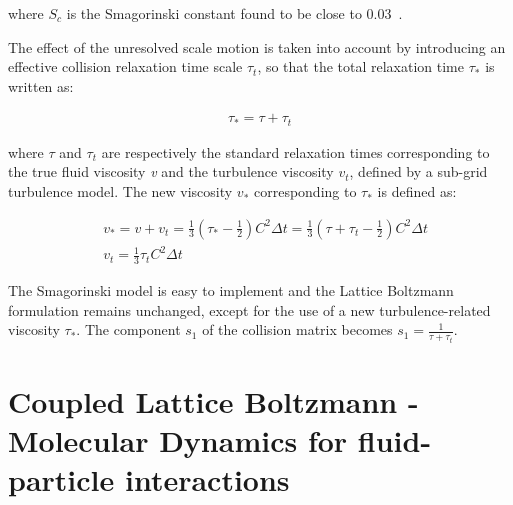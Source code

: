 where $\mathit{S}_{c}$ is the Smagorinski constant found to be close to 
0.03~\citep{yu2005}. 

The effect of the unresolved scale motion is taken into account by introducing 
an effective collision relaxation time scale $\tau_{t}$, so that the total 
relaxation time $\tau_{*}$ is written as:

\begin{align}
\tau_{*}=\tau + \tau_{t}
\end{align} 

where $\tau$ and $\tau_{t}$ are respectively the standard relaxation times 
corresponding to the true fluid viscosity \textit{v} and the turbulence 
viscosity $\mathit{v}_{\mathit{t}}$, defined by a sub-grid turbulence model. 
The new viscosity $\mathit{v}_{*}$ corresponding to $\tau_{*}$ is defined as:

\begin{align}
& 
\mathit{v}_{*}=\mathit{v}+\mathit{v}_{\mathit{t}}=\frac{1}{3}(\tau_{*}-\frac{1}{2})
\mathit{C}^{2} \Delta \mathit{t} 
=\frac{1}{3}(\tau+\tau_{t}-\frac{1}{2})\mathit{C}^{2} \Delta \mathit{t}  \\
& \mathit{v}_{\mathit{t}}=\frac{1}{3}\tau_{\mathit{t}}\mathit{C}^{2} \Delta 
\textit{t}
\end{align} 

The Smagorinski model is easy to implement and the Lattice Boltzmann 
formulation remains unchanged, except for the use of a new turbulence-related 
viscosity $\tau_{*}$. The component $s_1$ of the collision matrix becomes $s_1 
= \frac{1}{\tau+\tau_t}$.


\section{Coupled Lattice Boltzmann - Molecular Dynamics for fluid-particle 
interactions}

